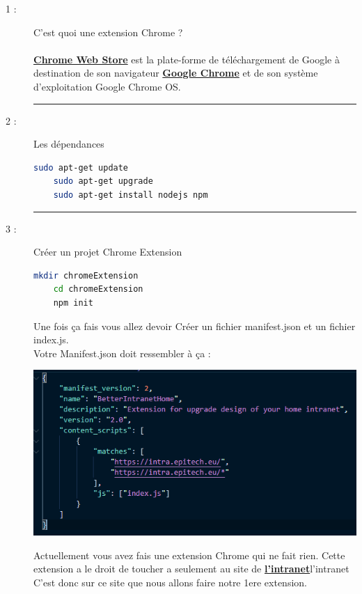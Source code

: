 \documentclass{article}
\begin{document}
    \begin{description}
        \item[1 :]{C'est quoi une extension Chrome ?} \\\\ \textbf{\href{https://chrome.google.com/webstore/category/extensions?hl=fr&authuser=0}{Chrome Web Store}} est la plate-forme de téléchargement de Google à destination de son navigateur \textbf{\href{https://www.google.com/intl/fr_fr/chrome/}{Google Chrome}} et de son système d'exploitation Google Chrome OS.
        \begin{center} 
            \rule{0.75\linewidth}{1pt}
        \end{center}
        \item[2 :]{Les dépendances}
\begin{lstlisting}[language=sh]
    sudo apt-get update
    sudo apt-get upgrade
    sudo apt-get install nodejs npm
\end{lstlisting}
        \begin{center} 
            \rule{0.75\linewidth}{1pt}
        \end{center}
        \item[3 :]{Créer un projet Chrome Extension}
\begin{lstlisting}[language=sh]
    mkdir chromeExtension
    cd chromeExtension
    npm init
\end{lstlisting}
        Une fois ça fais vous allez devoir Créer un fichier manifest.json et un fichier index.js.
        \\ Votre Manifest.json doit ressembler à ça :
        \begin{center}
            \includegraphics[scale=0.9]{../images/HowToManifest.PNG}
        \end{center}
        Actuellement vous avez fais une extension Chrome qui ne fait rien.
        Cette extension a le droit de toucher a seulement au site de \textbf{\href{https://intra.epitech.eu/}{l'intranet}}l'intranet C'est donc sur ce site que nous allons faire notre 1ere extension.

\end{description}
\end{document}

